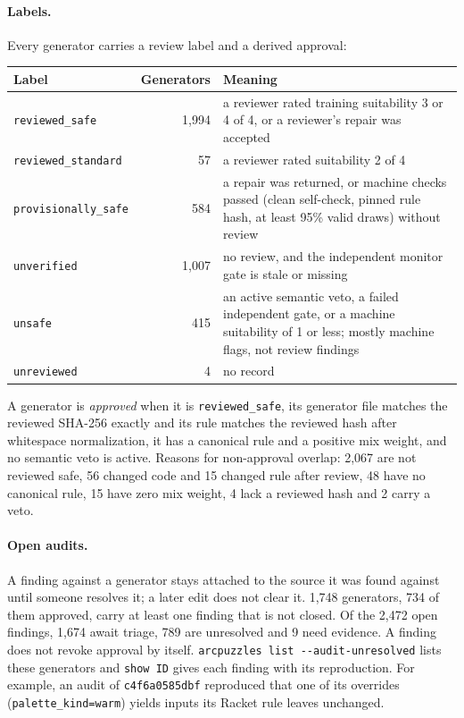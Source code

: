 \documentclass[11pt]{article}
\newcommand{\gen}[1]{\texttt{#1}}
\begin{document}
\paragraph{Labels.} Every generator carries a review label and a derived
approval:
\begin{center}
\small
\begin{tabularx}{\linewidth}{lrX}
\toprule
Label & Generators & Meaning \\
\midrule
\texttt{reviewed\_safe} & 1,994 & a reviewer rated training suitability 3 or 4 of 4, or a reviewer's repair was accepted \\
\texttt{reviewed\_standard} & 57 & a reviewer rated suitability 2 of 4 \\
\texttt{provisionally\_safe} & 584 & a repair was returned, or machine checks passed (clean self-check, pinned rule hash, at least 95\% valid draws) without review \\
\texttt{unverified} & 1,007 & no review, and the independent monitor gate is stale or missing \\
\texttt{unsafe} & 415 & an active semantic veto, a failed independent gate, or a machine suitability of 1 or less; mostly machine flags, not review findings \\
\texttt{unreviewed} & 4 & no record \\
\bottomrule
\end{tabularx}
\end{center}
A generator is \emph{approved} when it is \texttt{reviewed\_safe}, its generator
file matches the reviewed SHA-256 exactly and its rule matches the reviewed
hash after whitespace normalization, it has a canonical rule and a
positive mix weight, and no semantic veto is active. Reasons for non-approval
overlap: 2,067 are not reviewed safe, 56 changed code and 15 changed rule after
review, 48 have no canonical rule, 15 have zero mix weight, 4 lack a reviewed
hash and 2 carry a veto.

\paragraph{Open audits.} A finding against a generator stays attached to the
source it was found against until someone resolves it; a later edit does not
clear it. 1,748 generators, 734 of them approved, carry at least one finding
that is not closed. Of the 2,472 open findings, 1,674 await triage, 789 are
unresolved and 9 need evidence. A finding does not revoke approval by itself.
\texttt{arcpuzzles list -{}-audit-unresolved} lists these generators and
\texttt{show ID} gives each finding with its reproduction. For example, an
audit of \gen{c4f6a0585dbf} reproduced that one of its overrides
(\texttt{palette\_kind=warm}) yields inputs its Racket rule leaves unchanged.
\end{document}
